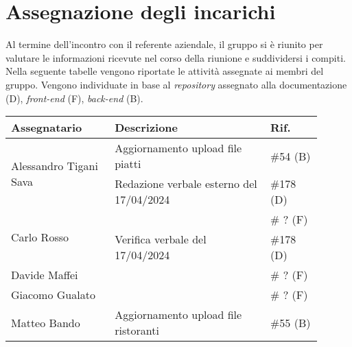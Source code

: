 \section{Assegnazione degli incarichi}
Al termine dell'incontro con il referente aziendale, il gruppo si è riunito per valutare le informazioni ricevute nel corso della riunione e suddividersi i compiti.\\
Nella seguente tabelle vengono riportate le attività assegnate ai membri del gruppo.
Vengono individuate in base al \textit{repository} assegnato alla documentazione (D), \textit{front-end} (F), \textit{back-end} (B).

\begin{center}
	{
		\renewcommand{\arraystretch}{1.5}
		\begin{tabular}{p{0.30\linewidth}|p{0.45\linewidth}|p{0.15\linewidth}}
			\textbf{Assegnatario}          			& \textbf{Descrizione}					& \textbf{Rif.} \\
			\hline
			\multirow{2}{*}{Alessandro Tigani Sava}	& Aggiornamento upload file	piatti 		& \#54 (B)	\\
			\cline{2-3}
													& Redazione verbale esterno del 17/04/2024	& \#178	(D)	\\
			\hline
			\multirow{2}{*}{Carlo Rosso}   			&	& \# ? (F)	\\
			\cline{2-3}
			                               			& Verifica verbale del 17/04/2024		& \#178	(D)	\\
			\hline
			Davide Maffei							& 	& \# ? (F)	\\
			\hline
			Giacomo Gualato							& 	& \# ? (F)	\\
			\hline
			Matteo Bando  							& Aggiornamento upload file	ristoranti	& \#55 (B)	\\
			\hline
		\end{tabular}
	}
\end{center}
